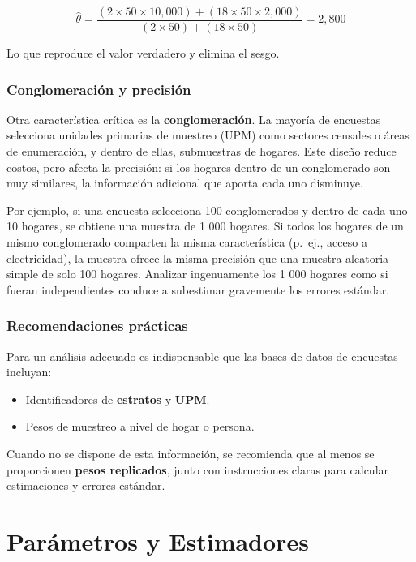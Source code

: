 \documentclass[
  12pt,
]{book}
\providecommand{\tightlist}{%
  \setlength{\itemsep}{0pt}\setlength{\parskip}{0pt}}
\begin{document}
\[
\hat{\theta} = \frac{(2 \times 50 \times 10,000) + (18 \times 50 \times 2,000)}{(2 \times 50) + (18 \times 50)} = 2,800
\]

Lo que reproduce el valor verdadero y elimina el sesgo.

\subsubsection{Conglomeración y precisión}\label{conglomeraciuxf3n-y-precisiuxf3n}

Otra característica crítica es la \textbf{conglomeración}. La mayoría de encuestas selecciona unidades primarias de muestreo (UPM) como sectores censales o áreas de enumeración, y dentro de ellas, submuestras de hogares. Este diseño reduce costos, pero afecta la precisión: si los hogares dentro de un conglomerado son muy similares, la información adicional que aporta cada uno disminuye.

Por ejemplo, si una encuesta selecciona 100 conglomerados y dentro de cada uno 10 hogares, se obtiene una muestra de 1 000 hogares. Si todos los hogares de un mismo conglomerado comparten la misma característica (p.~ej., acceso a electricidad), la muestra ofrece la misma precisión que una muestra aleatoria simple de solo 100 hogares. Analizar ingenuamente los 1 000 hogares como si fueran independientes conduce a subestimar gravemente los errores estándar.

\subsubsection{Recomendaciones prácticas}\label{recomendaciones-pruxe1cticas}

Para un análisis adecuado es indispensable que las bases de datos de encuestas incluyan:

\begin{itemize}
\tightlist
\item
  Identificadores de \textbf{estratos} y \textbf{UPM}.
\item
  Pesos de muestreo a nivel de hogar o persona.
\end{itemize}

Cuando no se dispone de esta información, se recomienda que al menos se proporcionen \textbf{pesos replicados}, junto con instrucciones claras para calcular estimaciones y errores estándar.

\section{Parámetros y Estimadores}\label{paruxe1metros-y-estimadores}
\end{document}
